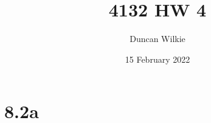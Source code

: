 \documentclass{article}
\title{4132 HW 4}
\author{Duncan Wilkie}
\date{15 February 2022}
\begin{document}
\maketitle

\section*{8.2a}
\end{document}
